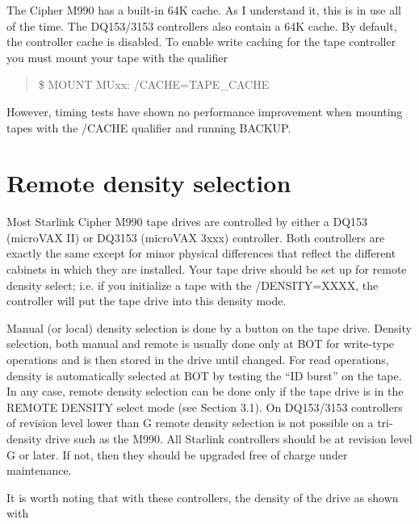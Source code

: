 The Cipher M990 has a built-in 64K cache. As I understand it, this is in use
all of the time. The DQ153/3153 controllers also contain a 64K cache. By
default, the controller cache is disabled. To enable write caching for the tape
controller you must mount your tape with the qualifier

\begin{quote}

\$ MOUNT MUxx: /CACHE=TAPE\_CACHE

\end{quote}


However, timing tests have shown no performance improvement when mounting tapes
with the /CACHE qualifier and running BACKUP.

\section{Remote density selection}

Most Starlink Cipher M990 tape drives are controlled by either a DQ153
(microVAX II) or DQ3153 (microVAX 3xxx) controller. Both controllers are
exactly the same except for minor physical differences that reflect the
different cabinets in which they are installed. Your tape drive should be set up
for remote density select; i.e. if you initialize a tape with the /DENSITY=XXXX,
the controller will put the tape drive into this  density mode.

Manual (or local) density selection is done by a button
on the tape drive. Density selection, both manual and remote is
usually done only at BOT for write-type operations and is then stored in the
drive until changed. For read operations, density is automatically selected at
BOT by testing the ``ID burst'' on the tape.
In any case, remote density selection can be
done only if the tape drive is in the REMOTE DENSITY  select mode (see Section
3.1). On
DQ153/3153 controllers of revision level lower than G remote density
selection is not possible on a tri-density drive such as the M990. All Starlink
controllers should be at revision level G or later. If not, then they should be
upgraded free of charge under maintenance.

It is worth noting that with these controllers, the density of the drive as
shown with

